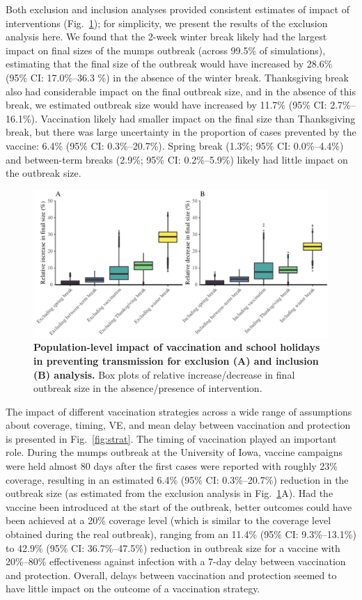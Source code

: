 \documentclass[12pt]{article}
\newcommand{\fref}[1]{Fig.~\ref{fig:#1}}
\begin{document}
Both exclusion and inclusion analyses provided consistent estimates of impact of interventions (\fref{popimp}); for simplicity, we present the results of the exclusion analysis here.
We found that the 2-week winter break likely had the largest impact on final sizes of the mumps outbreak (across 99.5\% of simulations), estimating that the final size of the outbreak would have increased by 28.6\% (95\% CI: 17.0\%--36.3 \%) in the absence of the winter break.
Thanksgiving break also had considerable impact on the final outbreak size, and in the absence of this break, we estimated outbreak size would have increased by 11.7\% (95\% CI: 2.7\%--16.1\%).
Vaccination likely had smaller impact on the final size than Thanksgiving break, but there was large uncertainty in the proportion of cases prevented by the vaccine: 6.4\% (95\% CI: 0.3\%--20.7\%).
Spring break (1.3\%; 95\% CI: 0.0\%--4.4\%) and between-term breaks (2.9\%; 95\% CI: 0.2\%--5.9\%) likely had little impact on the outbreak size.

\begin{figure}[!th]
\includegraphics[width=\textwidth]{../figure_stanfit_seirv_final/figure_stanfit_effects.pdf}
\caption{
\textbf{Population-level impact of vaccination and school holidays in preventing transmission for exclusion (A) and inclusion (B) analysis.}
Box plots of relative increase/decrease in final outbreak size in the absence/presence of intervention.
}
\label{fig:popimp}
\end{figure}

The impact of different vaccination strategies across a wide range of assumptions about coverage, timing, VE, and mean delay between vaccination and protection is presented in \fref{strat}.
The timing of vaccination played an important role.
During the mumps outbreak at the University of Iowa, vaccine campaigns were held almost 80 days after the first cases were reported with roughly 23\% coverage, resulting in an estimated 6.4\% (95\% CI: 0.3\%--20.7\%) reduction in the outbreak size (as estimated from the exclusion analysis in \fref{popimp}A).
Had the vaccine been introduced at the start of the outbreak, better outcomes could have been achieved at a 20\% coverage level (which is similar to the coverage level obtained during the real outbreak), ranging from an 11.4\% (95\% CI: 9.3\%--13.1\%) to 42.9\% (95\% CI: 36.7\%--47.5\%) reduction in outbreak size for a vaccine with 20\%--80\% effectiveness against infection with a 7-day delay between vaccination and protection.
Overall, delays between vaccination and protection seemed to have little impact on the outcome of a vaccination strategy.
\end{document}
